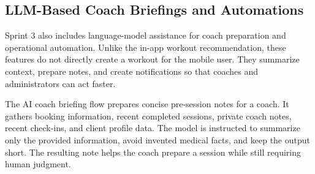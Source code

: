 \documentclass[12pt,a4paper,openany]{report}
\begin{document}
\subsection{LLM-Based Coach Briefings and Automations}

Sprint 3 also includes language-model assistance for coach preparation and operational automation. Unlike the in-app workout recommendation, these features do not directly create a workout for the mobile user. They summarize context, prepare notes, and create notifications so that coaches and administrators can act faster.


The AI coach briefing flow prepares concise pre-session notes for a coach. It gathers booking information, recent completed sessions, private coach notes, recent check-ins, and client profile data. The model is instructed to summarize only the provided information, avoid invented medical facts, and keep the output short. The resulting note helps the coach prepare a session while still requiring human judgment.
\end{document}
